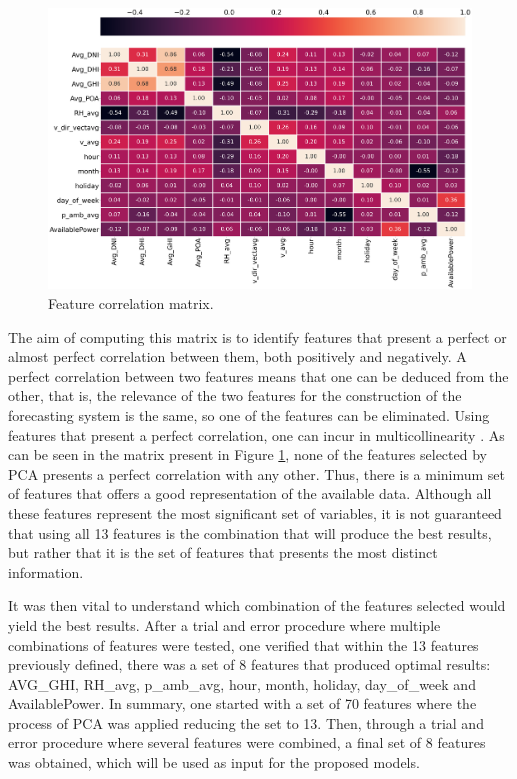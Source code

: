 \begin{figure}[h!]
    \centering
    \begin{center}
    \includegraphics[width=1\textwidth]{Images/corr1.PNG}
    \caption{Feature correlation matrix.}
    \label{corr}
    \end{center}
\end{figure}


The aim of computing this matrix is to identify features that present a perfect or almost perfect correlation between them, both positively and negatively. A perfect correlation between two features means that one can be deduced from the other, that is, the relevance of the two features for the construction of the forecasting system is the same, so one of the features can be eliminated. Using features that present a perfect correlation, one can incur in multicollinearity \cite{multicollinearity}. As can be seen in the matrix present in Figure \ref{corr}, none of the features selected by \ac{PCA} presents a perfect correlation with any other. Thus, there is a minimum set of features that offers a good representation of the available data. Although all these features represent the most significant set of variables, it is not guaranteed that using all 13 features is the combination that will produce the best results, but rather that it is the set of features that presents the most distinct information. 

It was then vital to understand which combination of the features selected would yield the best results. After a trial and error procedure where multiple combinations of features were tested, one verified that within the 13 features previously defined, there was a set of 8 features that produced optimal results: AVG\_GHI, RH\_avg, p\_amb\_avg, hour, month, holiday, day\_of\_week and AvailablePower. 
In summary, one started with a set of 70 features where the process of \ac{PCA} was applied reducing the set to 13. Then, through a trial and error procedure where several features were combined, a final set of 8 features was obtained, which will be used as input for the proposed models.



